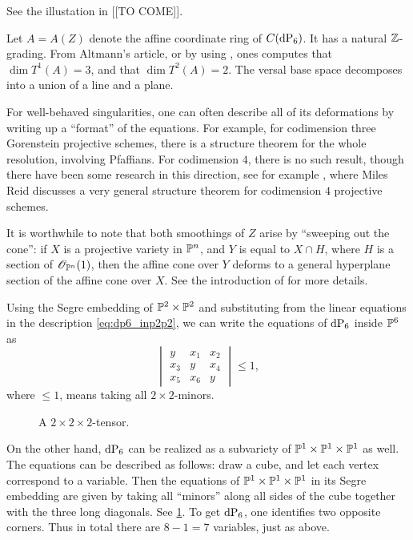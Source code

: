 See the illustation in [[TO COME]].


Let $A=A(Z)$ denote the affine coordinate ring of $C(\dP6)$. It has a natural $\Z$-grading. From Altmann's article, or by using \MM, ones computes that $\dim T^1(A)=3$, and that $\dim T^2(A)=2$. The versal base space decomposes into a union of a line and a plane.

For well-behaved singularities, one can often describe all of its deformations by writing up a ``format'' of the equations. For example, for codimension three Gorenstein projective schemes, there is a structure theorem for the whole resolution, involving Pfaffians. For codimension $4$, there is no such result, though there have been some research in this direction, see for example \cite{reid_codimension}, where Miles Reid discusses a very general structure theorem for codimension $4$ projective schemes.

It is worthwhile to note that both smoothings of $Z$ arise by ``sweeping out the cone'': if $X$ is a projective variety in $\P^n$, and $Y$ is equal to $X \cap H$, where $H$ is a section of $\OO_{\P^n}(1)$, then the affine cone over $Y$ deforms to a general hyperplane section of the affine cone over $X$. See the introduction of \cite{stevens_deformations} for more details.

Using the Segre embedding of $\P^2 \times \P^2$ and substituting from the linear equations in the description \cref{eq:dp6_inp2p2}, we can write the equations of $\dP6$ inside $\P^6$ as
\begin{equation}
\begin{vmatrix}
y & x_1 & x_2 \\
x_3 & y & x_4 \\
x_5 & x_6 & y
\end{vmatrix} \leq 1,
\end{equation}
where $\leq 1$, means taking all $2 \times 2$-minors.

\begin{figure}[t]
\centering

\caption{A $2 \times 2 \times 2$-tensor.}
\label{fig:p1p1p1_equations}
\end{figure}

On the other hand, $\dP6$ can be realized as a subvariety of $\P^1 \times \P^1 \times \P^1$ as well. The equations can be described as follows: draw a cube, and let each vertex correspond to a variable. Then the equations of $\P^1 \times \P^1 \times \P^1$ in its Segre embedding are given by taking all ``minors'' along all sides of the cube together with the three long diagonals. See \cref{fig:p1p1p1_equations}. To get $\dP6$, one identifies two opposite corners. Thus in total there are $8-1=7$ variables, just as above. 

